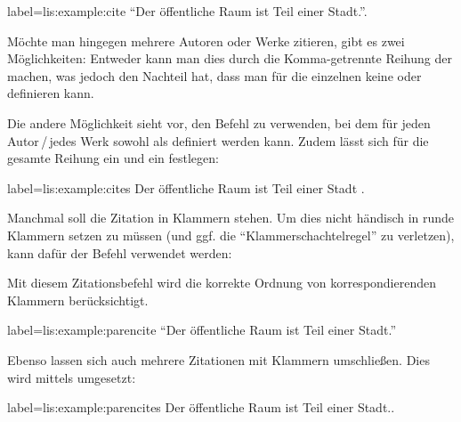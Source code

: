 \begin{lfgwexample}{label={lis:example:cite}}
\enquote{Der öffentliche Raum ist Teil einer Stadt.}\cite{Osland2016}.
\end{lfgwexample}

Möchte man hingegen mehrere Autoren oder Werke zitieren, 
gibt es zwei Möglichkeiten:
Entweder kann man dies durch die Komma-getrennte Reihung der  machen,
was jedoch den Nachteil hat, dass man für die einzelnen  keine  oder  definieren kann.

Die andere Möglichkeit sieht vor, den Befehl  zu verwenden, 
bei dem für jeden Autor\,/\,jedes Werk sowohl  als  definiert werden kann.
Zudem lässt sich für die gesamte Reihung ein  und ein  festlegen:
\begin{lfgwexample}{label={lis:example:cites}}
Der öffentliche Raum ist Teil einer Stadt \cites(vgl.)(){Osland2016} {Evangelidis2014}.
\end{lfgwexample}
 
 
Manchmal soll die Zitation in Klammern stehen.
Um dies nicht händisch in runde Klammern setzen zu müssen (und ggf. die \enquote{Klammerschachtelregel} zu verletzen),
kann dafür der Befehl   verwendet werden:
Mit diesem Zitationsbefehl wird die korrekte Ordnung von korrespondierenden Klammern berücksichtigt.
\begin{lfgwexample}{label={lis:example:parencite}}
\enquote{Der öffentliche Raum ist Teil einer Stadt.} \parencite{Osland2016}
\end{lfgwexample}

Ebenso lassen sich auch mehrere Zitationen mit Klammern umschließen.
Dies wird mittels  umgesetzt:
\begin{lfgwexample}{label={lis:example:parencites}}
Der öffentliche Raum ist Teil einer Stadt.\parencites(s.)(){Osland2016}
[vgl.][]{Evangelidis2014}.
\end{lfgwexample}

